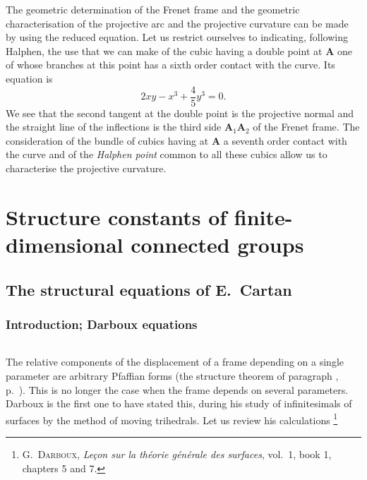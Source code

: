 The geometric determination of the Frenet frame and the geometric characterisation of the projective arc and the projective curvature can be made by using the reduced equation. Let us restrict ourselves to indicating, following Halphen, the use that we can make of the cubic having a double point at $\mathbf{A}$ one of whose branches at this point has a sixth order contact  with the curve. Its equation is
\[
2xy-x^{3}+\frac{4}{5}y^{3}=0.
\]
We see that the second tangent at the double point is the projective normal and the straight line of the inflections is the third side $\mathbf{A}_{1}\mathbf{A}_{2}$ of the Frenet frame. The consideration of the bundle of cubics having at $\mathbf{A}$ a seventh order contact with the curve and of the \emph{Halphen point} common to all these cubics allow us to characterise the projective curvature.


\part{Structure constants of finite-dimensional connected groups}
\label{part:struct-const-finite}

\chapter{The structural equations of E.~Cartan}
\label{cha:struct-equat-e}



\section{Introduction; Darboux equations}
\label{sec:intr-darb-equat}

\paragraph{}
\label{sec:152}
The relative components of the displacement of a frame depending on a single parameter are arbitrary Pfaffian forms (the structure theorem of paragraph , p.~\pageref{sec:77}). This is no longer the case when the frame depends on several parameters. Darboux is the first one to have stated this, during his study of infinitesimals of surfaces by the method of moving trihedrals. Let us review his calculations \footnote{\textsc{G.~Darboux}, \emph{Leçon sur la théorie générale des surfaces}, vol.~1, book 1, chapters 5 and 7.}

